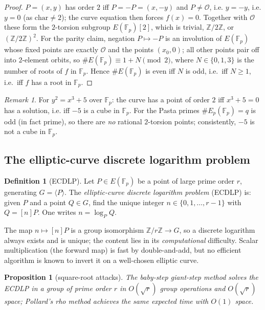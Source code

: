 \documentclass[11pt,a4paper]{article}
\newtheorem{proposition}[theorem]{Proposition}
\theoremstyle{definition}
\newtheorem{definition}[theorem]{Definition}
\theoremstyle{remark}
\newtheorem{remark}[theorem]{Remark}
\newcommand{\Z}{\ensuremath{\mathbb{Z}}}
\newcommand{\Fp}{\ensuremath{\mathbb{F}_{p}}}
\begin{document}
\begin{proof}
\(P = (x,y)\) has order \(2\) iff \(P = -P = (x, -y)\) and \(P \neq \mathcal{O}\), i.e. \(y = -y\), i.e. \(y = 0\) (as \(\mathrm{char}\neq 2\)); the curve equation then forces \(f(x) = 0\). Together with \(\mathcal{O}\) these form the \(2\)-torsion subgroup \(E(\Fp)[2]\), which is trivial, \(\Z/2\Z\), or \((\Z/2\Z)^2\). For the parity claim, negation \(P \mapsto -P\) is an involution of \(E(\Fp)\) whose fixed points are exactly \(\mathcal{O}\) and the points \((x_0, 0)\); all other points pair off into \(2\)-element orbits, so \(\#E(\Fp) \equiv 1 + N \pmod{2}\), where \(N \in \{0,1,3\}\) is the number of roots of \(f\) in \(\Fp\). Hence \(\#E(\Fp)\) is even iff \(N\) is odd, i.e.\ iff \(N \ge 1\), i.e.\ iff \(f\) has a root in \(\Fp\).
\end{proof}

\begin{remark}\label{ellipticcurves:rem-pasta-odd}
For \(y^2 = x^3 + 5\) over \(\Fp\): the curve has a point of order \(2\) iff \(x^3 + 5 = 0\) has a solution, i.e. iff \(-5\) is a cube in \(\Fp\). For the Pasta primes \(\#E_p(\Fp) = q\) is odd (in fact prime), so there are \emph{no} rational \(2\)-torsion points; consistently, \(-5\) is not a cube in \(\Fp\).
\end{remark}

\subsection{The elliptic-curve discrete logarithm problem}\label{ellipticcurves:subsec-ecdlp}

\begin{definition}[ECDLP]\label{ellipticcurves:def-ecdlp}
Let \(P \in E(\Fp)\) be a point of large prime order \(r\), generating \(G = \langle P\rangle\). The \emph{elliptic-curve discrete logarithm problem} (ECDLP) is: given \(P\) and a point \(Q \in G\), find the unique integer \(n \in \{0, 1, \ldots, r-1\}\) with \(Q = [n]P\). One writes \(n = \log_P Q\).
\end{definition}

The map \(n \mapsto [n]P\) is a group isomorphism \(\Z/r\Z \to G\), so a discrete logarithm always exists and is unique; the content lies in its \emph{computational} difficulty. Scalar multiplication (the forward map) is fast by double-and-add, but no efficient algorithm is known to invert it on a well-chosen elliptic curve.

\begin{proposition}[square-root attacks]\label{ellipticcurves:prop-ecdlp-sqrt}
The baby-step giant-step method solves the ECDLP in a group of prime order \(r\) in \(O(\sqrt{r})\) group operations and \(O(\sqrt r)\) space; Pollard's rho method achieves the same expected time with \(O(1)\) space.
\end{proposition}
\end{document}
